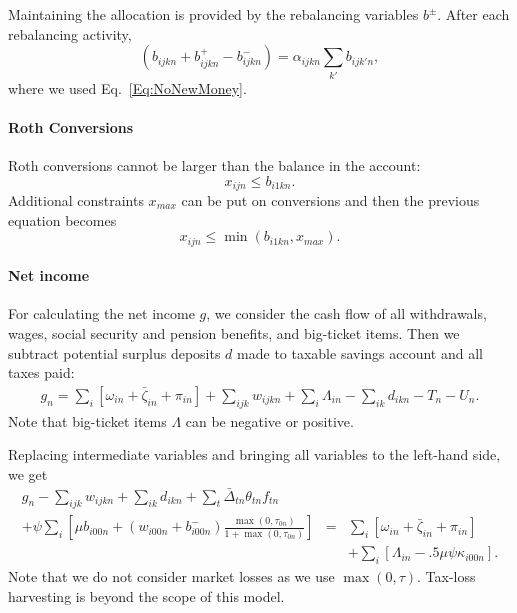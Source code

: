 \documentclass{article}[fleqn,12pt]
\begin{document}
	Maintaining the allocation is provided by the rebalancing variables $b^\pm$. After each
	rebalancing activity,
	\begin{equation}
		\label{Eq:Rebalance}
		(b_{ijkn} + b^+_{ijkn} - b^-_{ijkn}) = \alpha_{ijkn}\sum_{k'} b_{ijk'n},
	\end{equation}
	where we used Eq.~\ref{Eq:NoNewMoney}.

\paragraph*{Roth Conversions}
	Roth conversions cannot be larger than the balance in the account:
	\begin{equation}
		x_{ijn} \le b_{i1kn}.
	\end{equation}
	Additional constraints $x_{max}$ can be put on conversions and then the previous equation
	becomes
	\begin{equation}
		x_{ijn} \le \min(b_{i1kn}, x_{max}).
	\end{equation}

\paragraph*{Net income}
	For calculating the net income $g$, we consider the cash flow of all withdrawals,
	wages, social security and pension benefits, and big-ticket items. 
	Then we subtract potential surplus deposits $d$ made to taxable savings account
	and all taxes paid:
	\begin{eqnarray}
		g_n = \sum_i [\omega_{in} + \bar{\zeta}_{in} + \pi_{in} ] 
		+ \sum_{ijk} w_{ijkn} + \sum_i \Lambda_{in} - \sum_{ik}d_{ikn}
		- T_n - U_n.
	\end{eqnarray}
	Note that big-ticket items $\Lambda$ can be negative or positive.

	Replacing intermediate variables and bringing all variables to the left-hand side, we get
	\begin{eqnarray}
		\label{Eq:C4}
		g_n - \sum_{ijk} w_{ijkn} + \sum_{ik}d_{ikn}
		+ \sum_t \bar{\Delta}_{t n}\theta_{t n} f_{t n}&&\nonumber \\
		+ \psi \sum_{i} \left[\mu b_{i00n} + (w_{i00n} + b^-_{i00n})
		\frac{\max(0, \tau_{0n})}{1 + \max(0, \tau_{0n})}\right] 
		&= & \sum_i [\omega_{in} + \bar{\zeta}_{in} + \pi_{in} ] \nonumber\\
		&& + \sum_i [\Lambda_{in} - .5\mu\psi\kappa_{i00n}].
	\end{eqnarray}
	Note that we do not consider market losses as we use $\max(0, \tau)$. Tax-loss
	harvesting is beyond the scope of this model.
\end{document}
